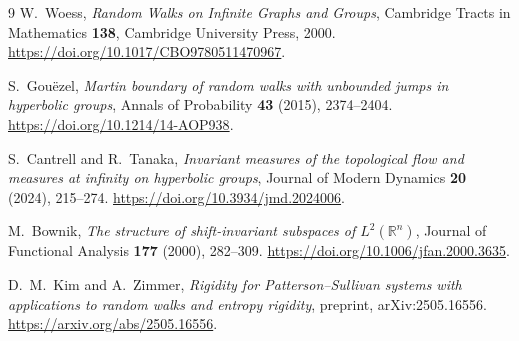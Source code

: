 \documentclass[11pt,a4paper]{article}
\theoremstyle{definition}
\theoremstyle{remark}
\numberwithin{equation}{section}
\begin{document}
\clearpage
\begin{thebibliography}{9}
W.~Woess, \emph{Random Walks on Infinite Graphs and Groups},
Cambridge Tracts in Mathematics \textbf{138}, Cambridge University Press,
2000. \url{https://doi.org/10.1017/CBO9780511470967}.

S.~Gou\"ezel, \emph{Martin boundary of random walks with unbounded jumps
in hyperbolic groups}, Annals of Probability \textbf{43} (2015),
2374--2404. \url{https://doi.org/10.1214/14-AOP938}.

S.~Cantrell and R.~Tanaka, \emph{Invariant measures of the topological
flow and measures at infinity on hyperbolic groups}, Journal of Modern
Dynamics \textbf{20} (2024), 215--274.
\url{https://doi.org/10.3934/jmd.2024006}.

M.~Bownik, \emph{The structure of shift-invariant subspaces of
$L^2(\mathbb R^n)$}, Journal of Functional Analysis \textbf{177} (2000),
282--309. \url{https://doi.org/10.1006/jfan.2000.3635}.

D.~M.~Kim and A.~Zimmer, \emph{Rigidity for Patterson--Sullivan systems
with applications to random walks and entropy rigidity}, preprint,
arXiv:2505.16556. \url{https://arxiv.org/abs/2505.16556}.
\end{thebibliography}
\end{document}
